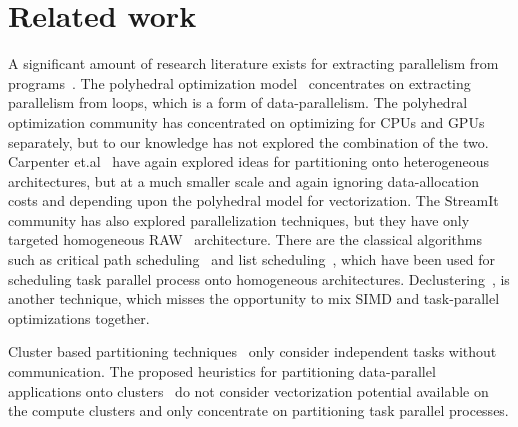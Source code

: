 \section{Related work}
\label{sec:related-work}

A significant amount of research literature exists for extracting
parallelism from programs~\cite{mgri98,jdon06,mgor06,gsih93,pcar09}. The
polyhedral optimization model~\cite{mgri98} concentrates on extracting
parallelism from loops, which is a form of data-parallelism. The
polyhedral optimization community has concentrated on optimizing for
CPUs and GPUs separately, but to our knowledge has not explored the
combination of the two. Carpenter et.al~\cite{pcar09} have again
explored ideas for partitioning onto heterogeneous architectures, but at
a much smaller scale and again ignoring data-allocation costs and
depending upon the polyhedral model for vectorization. The
StreamIt~\cite{wthi02} community has also explored parallelization
techniques, but they have only targeted homogeneous RAW~\cite{ewai97}
architecture. There are the classical algorithms such as critical path
scheduling~\cite{Kohler1975} and list scheduling~\cite{atho74}, which
have been used for scheduling task parallel process onto homogeneous
architectures. Declustering~\cite{gsih93}, is another technique, which
misses the opportunity to mix SIMD and task-parallel optimizations
together.

Cluster based partitioning techniques~\cite{mmah99,adou04,tbra01} only
consider independent tasks without communication. The proposed
heuristics for partitioning data-parallel applications onto
clusters~\cite{ssan05,skum02} do not consider vectorization potential
available on the compute clusters and only concentrate on partitioning
task parallel processes.

